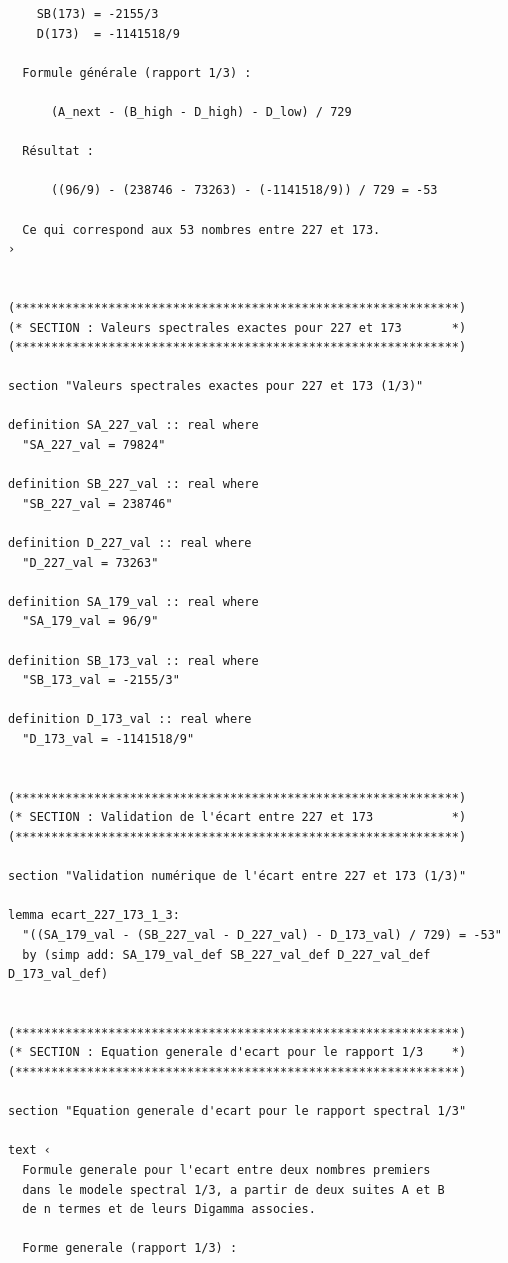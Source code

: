\documentclass[a4paper,11pt]{article}
\begin{document}
\begin{holcode}[title={\textcolor{white}{File: methode\_spectral.thy -- Part 1/4}}]
\begin{lstlisting}
    SB(173) = -2155/3
    D(173)  = -1141518/9

  Formule générale (rapport 1/3) :

      (A_next - (B_high - D_high) - D_low) / 729

  Résultat :

      ((96/9) - (238746 - 73263) - (-1141518/9)) / 729 = -53

  Ce qui correspond aux 53 nombres entre 227 et 173.
›


(**************************************************************)
(* SECTION : Valeurs spectrales exactes pour 227 et 173       *)
(**************************************************************)

section "Valeurs spectrales exactes pour 227 et 173 (1/3)"

definition SA_227_val :: real where
  "SA_227_val = 79824"

definition SB_227_val :: real where
  "SB_227_val = 238746"

definition D_227_val :: real where
  "D_227_val = 73263"

definition SA_179_val :: real where
  "SA_179_val = 96/9"

definition SB_173_val :: real where
  "SB_173_val = -2155/3"

definition D_173_val :: real where
  "D_173_val = -1141518/9"


(**************************************************************)
(* SECTION : Validation de l'écart entre 227 et 173           *)
(**************************************************************)

section "Validation numérique de l'écart entre 227 et 173 (1/3)"

lemma ecart_227_173_1_3:
  "((SA_179_val - (SB_227_val - D_227_val) - D_173_val) / 729) = -53"
  by (simp add: SA_179_val_def SB_227_val_def D_227_val_def D_173_val_def)


(**************************************************************)
(* SECTION : Equation generale d'ecart pour le rapport 1/3    *)
(**************************************************************)

section "Equation generale d'ecart pour le rapport spectral 1/3"

text ‹
  Formule generale pour l'ecart entre deux nombres premiers
  dans le modele spectral 1/3, a partir de deux suites A et B
  de n termes et de leurs Digamma associes.

  Forme generale (rapport 1/3) :


\end{lstlisting}
\end{holcode}
\end{document}

